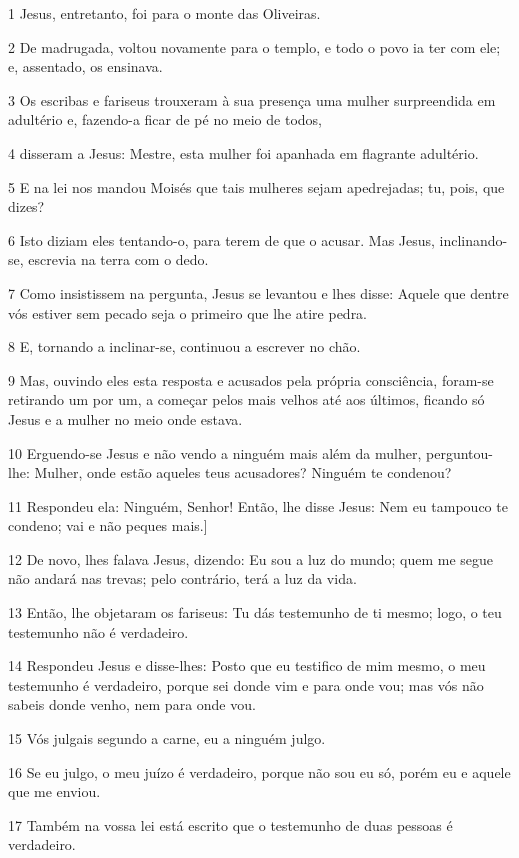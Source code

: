 \par 1 Jesus, entretanto, foi para o monte das Oliveiras.
\par 2 De madrugada, voltou novamente para o templo, e todo o povo ia ter com ele; e, assentado, os ensinava.
\par 3 Os escribas e fariseus trouxeram à sua presença uma mulher surpreendida em adultério e, fazendo-a ficar de pé no meio de todos,
\par 4 disseram a Jesus: Mestre, esta mulher foi apanhada em flagrante adultério.
\par 5 E na lei nos mandou Moisés que tais mulheres sejam apedrejadas; tu, pois, que dizes?
\par 6 Isto diziam eles tentando-o, para terem de que o acusar. Mas Jesus, inclinando-se, escrevia na terra com o dedo.
\par 7 Como insistissem na pergunta, Jesus se levantou e lhes disse: Aquele que dentre vós estiver sem pecado seja o primeiro que lhe atire pedra.
\par 8 E, tornando a inclinar-se, continuou a escrever no chão.
\par 9 Mas, ouvindo eles esta resposta e acusados pela própria consciência, foram-se retirando um por um, a começar pelos mais velhos até aos últimos, ficando só Jesus e a mulher no meio onde estava.
\par 10 Erguendo-se Jesus e não vendo a ninguém mais além da mulher, perguntou-lhe: Mulher, onde estão aqueles teus acusadores? Ninguém te condenou?
\par 11 Respondeu ela: Ninguém, Senhor! Então, lhe disse Jesus: Nem eu tampouco te condeno; vai e não peques mais.]
\par 12 De novo, lhes falava Jesus, dizendo: Eu sou a luz do mundo; quem me segue não andará nas trevas; pelo contrário, terá a luz da vida.
\par 13 Então, lhe objetaram os fariseus: Tu dás testemunho de ti mesmo; logo, o teu testemunho não é verdadeiro.
\par 14 Respondeu Jesus e disse-lhes: Posto que eu testifico de mim mesmo, o meu testemunho é verdadeiro, porque sei donde vim e para onde vou; mas vós não sabeis donde venho, nem para onde vou.
\par 15 Vós julgais segundo a carne, eu a ninguém julgo.
\par 16 Se eu julgo, o meu juízo é verdadeiro, porque não sou eu só, porém eu e aquele que me enviou.
\par 17 Também na vossa lei está escrito que o testemunho de duas pessoas é verdadeiro.
